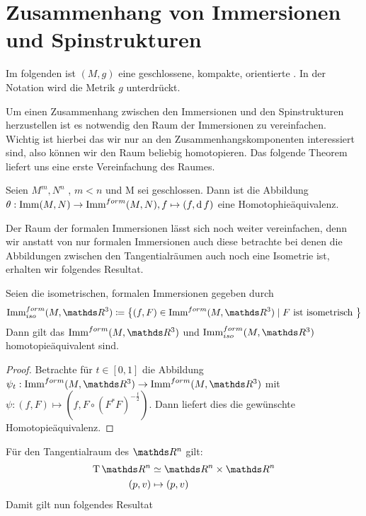 \section{Zusammenhang von Immersionen und Spinstrukturen}

Im folgenden ist $(M,g)$ eine geschlossene, kompakte, orientierte \mfg.
In der Notation wird die Metrik $g$ unterdrückt.


Um einen Zusammenhang zwischen den Immersionen und den Spinstrukturen
herzustellen ist es notwendig den Raum der Immersionen zu vereinfachen.
Wichtig ist hierbei das wir nur an den Zusammenhangskomponenten interessiert
sind, also können wir den Raum beliebig homotopieren. Das folgende Theorem
liefert uns eine erste Vereinfachung des Raumes.
\begin{Thm}
	Seien $M^m,N^n$ \mfgen, $m<n$ und M sei geschlossen. Dann ist die Abbildung
	$\theta : \operatorname{Imm}(M,N) \rightarrow \operatorname{Imm}^{form}(M,N), f \mapsto (f,\operatorname{d} f)$ eine Homotophieäquivalenz.
\end{Thm}

Der Raum der formalen Immersionen lässt sich noch weiter vereinfachen, denn
wir anstatt von nur formalen Immersionen auch diese betrachte bei denen
die Abbildungen zwischen den Tangentialräumen auch noch eine Isometrie ist,
erhalten wir folgendes Resultat.


\begin{Satz}
	Seien die isometrischen, formalen Immersionen gegeben durch
	\begin{gather*}
	\Immfi{M}{\R^3} \coloneqq \set{(f,F) \in \Immf{M}{\R^3}}{F \text{ ist isometrisch }}
	\end{gather*}
	Dann gilt das $\Immf{M}{\R^3}$ und $\Immfi{M}{\R^3}$ homotopieäquivalent sind.
	\begin{proof}
		Betrachte für $t \in [0,1]$ die Abbildung $\abb{\psi_t}{\Immf{M}{\R^3}}{\Immf{M}{\R^3}}$ mit 
		$\psi : (f,F) \mapsto (f,F \circ (F^{\ast}F)^{-\frac{t}{2}})$.
		Dann liefert dies die gewünschte Homotopieäquivalenz.
	\end{proof}
\end{Satz}

Für den Tangentialraum des $\R^n$ gilt:
\begin{align*}
	\T \R^n &\simeq \R^n \times \R^n \\
	(p,v) &\mapsto (p,v)
\end{align*}
Damit gilt nun folgendes Resultat

